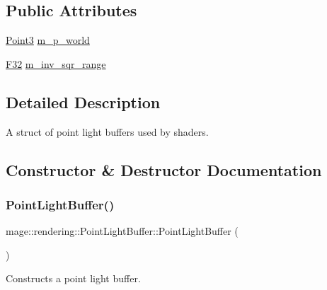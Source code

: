 \subsection*{Public Attributes}
\begin{DoxyCompactItemize}
\item 
\mbox{\hyperlink{structmage_1_1_point3}{Point3}} \mbox{\hyperlink{structmage_1_1rendering_1_1_point_light_buffer_abbc64dd98dec18dadc0a3c0003c0e750}{m\+\_\+p\+\_\+world}}
\item 
\mbox{\hyperlink{namespacemage_aa97e833b45f06d60a0a9c4fc22ae02c0}{F32}} \mbox{\hyperlink{structmage_1_1rendering_1_1_point_light_buffer_ad351e938a243a19ce0ba55792d2aed65}{m\+\_\+inv\+\_\+sqr\+\_\+range}}
\end{DoxyCompactItemize}


\subsection{Detailed Description}
A struct of point light buffers used by shaders. 

\subsection{Constructor \& Destructor Documentation}
\mbox{\label{structmage_1_1rendering_1_1_point_light_buffer_a1b1cfb7f21b62216c1cf827a4b5ecb0b}} 
\subsubsection{\texorpdfstring{Point\+Light\+Buffer()}{PointLightBuffer()}\hspace{0.1cm}{\footnotesize\ttfamily [1/3]}}
{\footnotesize\ttfamily mage\+::rendering\+::\+Point\+Light\+Buffer\+::\+Point\+Light\+Buffer (\begin{DoxyParamCaption}{ }\end{DoxyParamCaption})\hspace{0.3cm}{\ttfamily [noexcept]}}

Constructs a point light buffer. \mbox{\label{structmage_1_1rendering_1_1_point_light_buffer_ae6ba19d082d27864c4547f220f5fbaf5}} 
